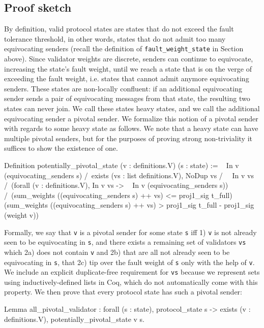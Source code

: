 \documentclass[runningheads]{llncs}
\begin{document}
\subsection{Proof sketch}
By definition, valid protocol states are states that do not exceed the fault tolerance threshold, in other words, states that do not admit too many equivocating senders (recall the definition of \verb|fault_weight_state| in Section \label{sec:formalization} above). Since validator weights are discrete, senders can continue to equivocate, increasing the state's fault weight, until we reach a state that is on the verge of exceeding the fault weight, i.e. states that cannot admit anymore equivocating senders. These states are non-locally confluent: if an additional equivocating sender sends a pair of equivocating messages from that state, the resulting two states can never join. We call these states heavy states, and we call the additional equivocating sender a pivotal sender. We formalize this notion of a pivotal sender with regards to some heavy state as follows. We note that a heavy state can have multiple pivotal senders, but for the purposes of proving strong non-triviality it suffices to show the existence of one.
\begin{coq}
Definition potentially_pivotal_state (v : definitions.V)
																		 (s : state) :=
	~ In v (equivocating_senders s) /\
	exists (vs : list definitions.V),
	NoDup vs /\
	~ In v vs /\
	(forall (v : definitions.V),
	In v vs -> ~ In v (equivocating_senders s)) /\
	(sum_weights ((equivocating_senders s) ++ vs)
	<= proj1_sig t_full)%
	(sum_weights ((equivocating_senders s) ++ vs) >
	proj1_sig t_full - proj1_sig (weight v))%
\end{coq}
Formally, we say that \verb|v| is a pivotal sender for some state \verb|s| iff 1) \verb|v| is not already seen to be equivocating in \verb|s|, and there exists a remaining set of validators \verb|vs| which 2a) does not contain \verb|v| and 2b) that are all not already seen to be equivocating in \verb|s|, that 2c) tip over the fault weight of \verb|s| only with the help of \verb|v|. We include an explicit duplicate-free requirement for \verb|vs| because we represent sets using inductively-defined lists in Coq, which do not automatically come with this property.
We then prove that every protocol state has such a pivotal sender:
\begin{coq}
Lemma all_pivotal_validator :
	forall (s : state),
	protocol_state s ->
	exists (v : definitions.V),
	potentially_pivotal_state v s.
\end{coq}
\end{document}
